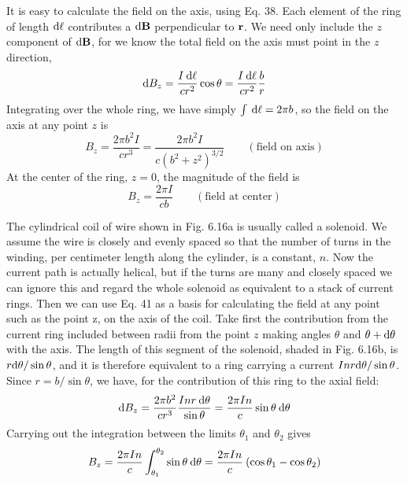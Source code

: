 It is easy to calculate the field on the axis, using Eq. 38. Each element
of the ring of length $\textup{d}\ell$ contributes a $\textup{d}\mathbf{B}$ perpendicular to $\mathbf{r}$. We
need only include the $z$ component of $\textup{d}\mathbf{B}$, for we know the total field
on the axis must point in the $z$ direction,
\begin{equation}
  \textup{d} B_z = \frac{I\:\textup{d}\ell}{cr^2} \cos\theta = \frac{I\:\textup{d}\ell}{cr^2} \frac{b}{r}
\end{equation}
Integrating over the whole ring, we have simply $\int\:\textup{d}\ell = 2\pi b$, so the
field on the axis at any point $z$ is
\begin{equation}
  B_z = \frac{2\pi b^2I}{cr^3} = \frac{2\pi b^2I}{c(b^2+z^2)^{3/2}}
           \qquad (\text{field on axis})
\end{equation}
At the center of the ring, $z=0$, the magnitude of the field is
\begin{equation}
  B_z = \frac{2\pi I}{cb}
           \qquad (\text{field at center})
\end{equation}

The cylindrical coil of wire shown in Fig. 6.16a is usually called a
solenoid. We assume the wire is closely and evenly spaced so that
the number of turns in the winding, per centimeter length along the
cylinder, is a constant, $n$. Now the current path is actually helical,
but if the turns are many and closely spaced we can ignore this and
regard the whole solenoid as equivalent to a stack of current rings.
Then we can use Eq. 41 as a basis for calculating the field at any point
such as the point z, on the axis of the coil. Take first the contribution
from the current ring included between radii from the point $z$ making
angles $\theta$ and $\theta+\textup{d}\theta$ with the axis. The length of this segment of the
solenoid, shaded in Fig. 6.16b, is $r\textup{d}\theta/\sin\theta$, and it is therefore equivalent
to a ring carrying a current $Inr \textup{d}\theta/ \sin \theta$. Since $r = b/ \sin\theta$, we
have, for the contribution of this ring to the axial field:
\begin{equation}
  \textup{d} B_z = \frac{2\pi b^2}{cr^3}\frac{Inr\:\textup{d}\theta}{\sin\theta}
            = \frac{2\pi I n}{c} \sin\theta\:\textup{d}\theta
\end{equation}
Carrying out the integration between the limits $\theta_1$ and $\theta_2$ gives
\begin{equation}
  B_z = \frac{2\pi I n}{c} \int_{\theta_1}^{\theta_2} \sin\theta\:\textup{d}\theta
      = \frac{2\pi I n}{c}\:(\cos\theta_1 - \cos\theta_2)
\end{equation}

